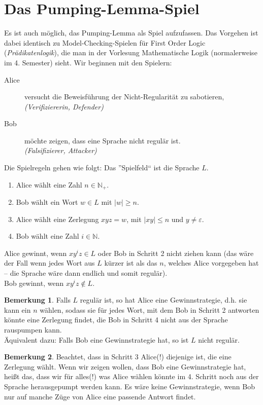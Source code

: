 \documentclass[11pt, a4paper]{article}
\theoremstyle{definition}
\newtheorem*{remark*}{Bemerkung}
\theoremstyle{plain}
\begin{document}
\section*{Das Pumping-Lemma-Spiel}
Es ist auch möglich, das Pumping-Lemma als Spiel aufzufassen. Das Vorgehen ist dabei identisch zu Model-Checking-Spielen für First Order Logic (\textit{Prädikatenlogik}), die man in der Vorlesung Mathematische Logik (normalerweise im 4. Semester) sieht. Wir beginnen mit den Spielern:
\begin{description}
	\item[Alice] versucht die Beweisführung der Nicht-Regularität zu sabotieren,\\
		\textit{(Verifiziererin, Defender)}
	\item[Bob] möchte zeigen, dass eine Sprache nicht regulär ist.\\
		\textit{(Falsifizierer, Attacker)}
\end{description}
Die Spielregeln gehen wie folgt: Das ''Spielfeld`` ist die Sprache $L$.
\begin{enumerate}[label=\arabic*)]
	\item Alice wählt eine Zahl $n \in \mathbb{N}_+$.
	\item Bob wählt ein Wort $w \in L$ mit $\left| w \right| \geq n$.
	\item Alice wählt eine Zerlegung $xyz = w$, mit $\left| xy \right| \leq n$ und $y \neq \varepsilon$.
	\item Bob wählt eine Zahl $i \in \mathbb{N}$.
\end{enumerate}
Alice gewinnt, wenn $xy^iz \in L$ oder Bob in Schritt 2 nicht ziehen kann (das wäre der Fall wenn jedes Wort aus $L$ kürzer ist als das $n$, welches Alice vorgegeben hat -- die Sprache wäre dann endlich und somit regulär).\\
Bob gewinnt, wenn $xy^iz \notin L$.

\begin{remark*}
	Falls $L$ regulär ist, so hat Alice eine Gewinnstrategie, d.h. sie kann ein $n$ wählen, sodass sie für jedes Wort, mit dem Bob in Schritt 2 antworten könnte eine Zerlegung findet, die Bob in Schritt 4 nicht aus der Sprache rauspumpen kann.\\
	Äquivalent dazu: Falls Bob eine Gewinnstrategie hat, so ist $L$ nicht regulär.
\end{remark*}
\begin{remark*}
	Beachtet, dass in Schritt 3 Alice(!) diejenige ist, die eine Zerlegung wählt. Wenn wir zeigen wollen, dass Bob eine Gewinnstrategie hat, heißt das, dass wir für alles(!) was Alice wählen könnte im 4. Schritt noch aus der Sprache herausgepumpt werden kann. Es wäre keine Gewinnstrategie, wenn Bob nur auf manche Züge von Alice eine passende Antwort findet.
\end{remark*}
\end{document}
